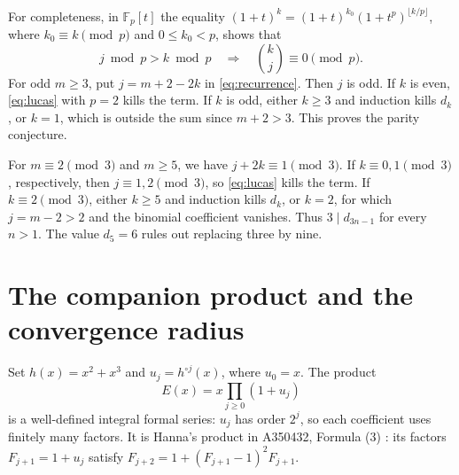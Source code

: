 \documentclass[11pt]{article}
\newcommand{\Fp}{\mathbb F}
\begin{document}
For completeness, in $\Fp_p[t]$ the equality
$(1+t)^k=(1+t)^{k_0}(1+t^p)^{\lfloor k/p\rfloor}$, where
$k_0\equiv k\pmod p$ and $0\leq k_0<p$, shows that
\begin{equation}\label{eq:lucas}
 j\bmod p>k\bmod p\quad\Longrightarrow\quad
 \binom{k}{j}\equiv0\pmod p.
\end{equation}
For odd $m\geq3$, put $j=m+2-2k$ in \eqref{eq:recurrence}.
Then $j$ is odd. If $k$ is even, \eqref{eq:lucas} with $p=2$
kills the term. If $k$ is odd, either $k\geq3$ and induction kills
$d_k$, or $k=1$, which is outside the sum since $m+2>3$.
This proves the parity conjecture.

For $m\equiv2\pmod3$ and $m\geq5$, we have $j+2k\equiv1\pmod3$.
If $k\equiv0,1\pmod3$, respectively, then $j\equiv1,2\pmod3$,
so \eqref{eq:lucas} kills the term. If $k\equiv2\pmod3$, either
$k\geq5$ and induction kills $d_k$, or $k=2$, for which $j=m-2>2$
and the binomial coefficient vanishes. Thus $3\mid d_{3n-1}$ for
every $n>1$. The value $d_5=6$ rules out replacing three by nine.

\section{The companion product and the convergence radius}

Set $h(x)=x^2+x^3$ and $u_j=h^{\circ j}(x)$, where $u_0=x$.
The product
\[
 E(x)=x\prod_{j\geq0}(1+u_j)
\]
is a well-defined integral formal series: $u_j$ has order $2^j$, so
each coefficient uses finitely many factors. It is Hanna's product
in A350432, Formula (3) \cite{hanna432}: its factors $F_{j+1}=1+u_j$
satisfy $F_{j+2}=1+(F_{j+1}-1)^2F_{j+1}$.
\end{document}
